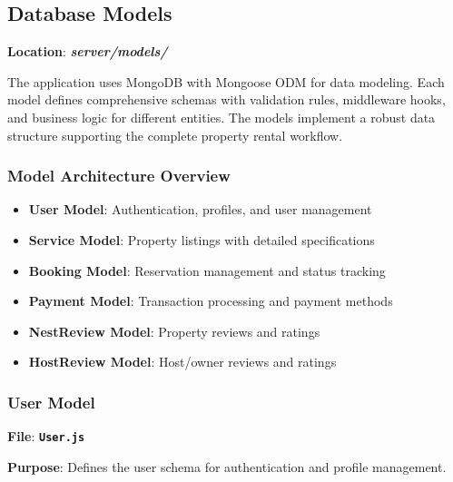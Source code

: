 \documentclass[12pt,a4paper]{article}
\newcommand{\file}[1]{\textbf{\texttt{#1}}}
\newcommand{\folder}[1]{\textbf{\textit{#1}}}
\begin{document}
\subsection{Database Models}
\label{subsec:database-models}

\textbf{Location}: \folder{server/models/}

The application uses MongoDB with Mongoose ODM for data modeling. Each model defines comprehensive schemas with validation rules, middleware hooks, and business logic for different entities. The models implement a robust data structure supporting the complete property rental workflow.

\subsubsection{Model Architecture Overview}
\begin{itemize}
\item \textbf{User Model}: Authentication, profiles, and user management
\item \textbf{Service Model}: Property listings with detailed specifications
\item \textbf{Booking Model}: Reservation management and status tracking
\item \textbf{Payment Model}: Transaction processing and payment methods
\item \textbf{NestReview Model}: Property reviews and ratings
\item \textbf{HostReview Model}: Host/owner reviews and ratings
\end{itemize}

\subsubsection{User Model}
\label{subsubsec:user-model}

\textbf{File}: \file{User.js}

\textbf{Purpose}: Defines the user schema for authentication and profile management.
\end{document}
